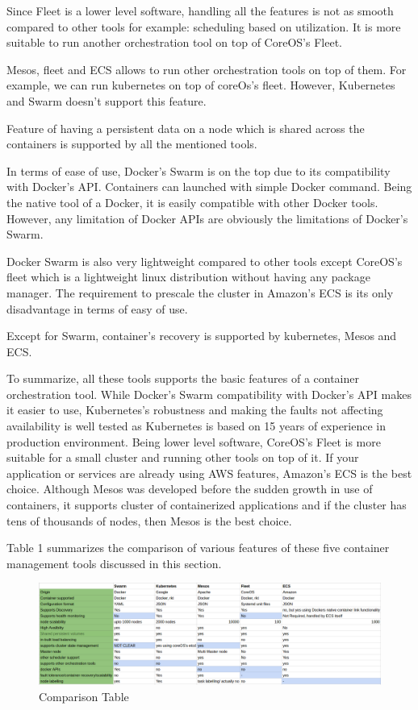 Since Fleet is a lower level software, handling all the features is not as smooth compared to other tools for example: scheduling based on utilization. It is more suitable to run another orchestration tool on top of CoreOS's Fleet.

Mesos, fleet and ECS allows to run other orchestration tools on top of them. For example, we can run kubernetes on top of coreOs's fleet. However, Kubernetes and Swarm doesn't support this feature.

Feature of having a persistent data on a node which is shared across the containers is supported by all the mentioned tools.

In terms of ease of use, Docker's Swarm is on the top due to its compatibility with Docker's API. Containers can launched with simple Docker command. Being the native tool of a Docker, it is easily compatible with other Docker tools. However, any limitation of Docker APIs are obviously the limitations of Docker's Swarm.

Docker Swarm is also very lightweight compared to other tools except CoreOS's fleet which is a lightweight linux distribution without having any package manager. The requirement to prescale the cluster in Amazon's ECS is its only disadvantage in terms of easy of use.

Except for Swarm, container's recovery is supported by kubernetes, Mesos and ECS.

To summarize, all these tools supports the basic features of a container orchestration tool. While Docker's Swarm compatibility with Docker's API makes it easier to use, Kubernetes's robustness and making the faults not affecting availability is well tested as Kubernetes is based on 15 years of experience in production environment. Being lower level software, CoreOS's Fleet is more suitable for a small cluster and running other tools on top of it. If your application or services are already using AWS features, Amazon's ECS is the best choice. Although Mesos was developed before the sudden growth in use of containers, it supports cluster of containerized applications and if the cluster has tens of thousands of nodes, then Mesos is the best choice.

Table 1 summarizes the comparison of various features of these five container management tools discussed in this section.

\begin{figure}
\centering
\includegraphics[width=\textwidth]{./fig/comparison}
\caption{Comparison Table}
\label{fig:comparison}
\end{figure}


